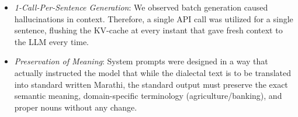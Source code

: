 \documentclass[11pt, a4paper]{article}
\begin{document}
\begin{itemize}
    \item {\fontsize{11pt}{14pt}\selectfont\itshape 1-Call-Per-Sentence Generation}: We observed batch generation caused hallucinations in context. Therefore, a single API call was utilized for a single sentence, flushing the KV-cache at every instant that gave fresh context to the LLM every time.
    \item {\fontsize{11pt}{14pt}\selectfont\itshape Preservation of Meaning}: System prompts were designed in a way that actually instructed the model that while the dialectal text is to be translated into standard written Marathi, the standard output must preserve the exact semantic meaning, domain-specific terminology (agriculture/banking), and proper nouns without any change.
\end{itemize}
\end{document}
